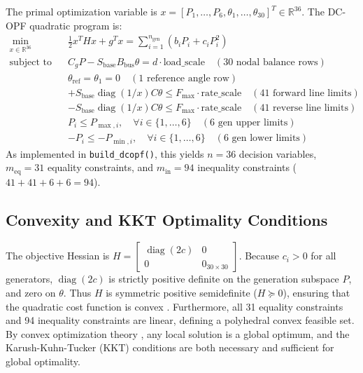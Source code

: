 The primal optimization variable is $x = [P_1, \dots, P_6, \theta_1, \dots, \theta_{30}]^T \in \mathbb{R}^{36}$. The DC-OPF quadratic program is:
\begin{align}
    \min_{x \in \mathbb{R}^{36}} \quad & \frac{1}{2} x^T H x + g^T x = \sum_{i=1}^{n_{\text{gen}}} \left( b_i P_i + c_i P_i^2 \right) \label{eq:dcopf_obj} \\
    \text{subject to} \quad & C_g P - S_{\text{base}} B_{\text{bus}} \theta = d \cdot \text{load\_scale} \quad (30\text{ nodal balance rows}) \label{eq:dcopf_balance} \\
    & \theta_{\text{ref}} = \theta_1 = 0 \quad (1\text{ reference angle row}) \label{eq:dcopf_ref} \\
    & +S_{\text{base}} \operatorname{diag}(1/x) C \theta \le F_{\max} \cdot \text{rate\_scale} \quad (41\text{ forward line limits}) \label{eq:dcopf_line_fwd} \\
    & -S_{\text{base}} \operatorname{diag}(1/x) C \theta \le F_{\max} \cdot \text{rate\_scale} \quad (41\text{ reverse line limits}) \label{eq:dcopf_line_rev} \\
    & P_i \le P_{\max, i}, \quad \forall i \in \{1, \dots, 6\} \quad (6\text{ gen upper limits}) \label{eq:dcopf_gen_up} \\
    & -P_i \le -P_{\min, i}, \quad \forall i \in \{1, \dots, 6\} \quad (6\text{ gen lower limits}) \label{eq:dcopf_gen_lo}
\end{align}
As implemented in \texttt{build\_dcopf()}, this yields $n = 36$ decision variables, $m_{\text{eq}} = 31$ equality constraints, and $m_{\text{in}} = 94$ inequality constraints ($41 + 41 + 6 + 6 = 94$).

\subsection{Convexity and KKT Optimality Conditions}
The objective Hessian is $H = \begin{bmatrix} \operatorname{diag}(2c) & 0 \\ 0 & 0_{30 \times 30} \end{bmatrix}$. Because $c_i > 0$ for all generators, $\operatorname{diag}(2c)$ is strictly positive definite on the generation subspace $P$, and zero on $\theta$. Thus $H$ is symmetric positive semidefinite ($H \succeq 0$), ensuring that the quadratic cost function is convex \cite{boyd2004}. Furthermore, all 31 equality constraints and 94 inequality constraints are linear, defining a polyhedral convex feasible set. By convex optimization theory \cite{boyd2004, nocedal2006}, any local solution is a global optimum, and the Karush-Kuhn-Tucker (KKT) conditions are both necessary and sufficient for global optimality.

